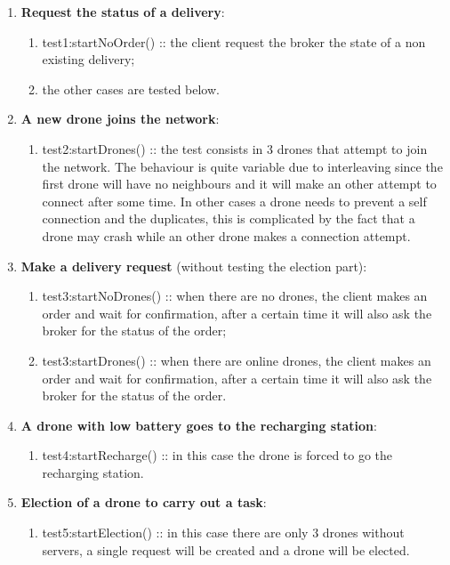 \documentclass[a4paper, oneside]{memoir}
\begin{document}
\begin{enumerate}
\item \textbf{Request the status of a delivery}:
	\begin{enumerate}
	\item \textsf{test1:startNoOrder()} :: the client request the broker the state of a non existing delivery;
	\item the other cases are tested below.
	\end{enumerate}

\item \textbf{A new drone joins the network}:
	\begin{enumerate}
	\item \textsf{test2:startDrones()} :: the test consists in 3 drones that attempt to join the network. The behaviour is quite variable due to interleaving since the first drone will have no neighbours and it will make an other attempt to connect after some time. In other cases a drone needs to prevent a self connection and the duplicates, this is complicated by the fact that a drone may crash while an other drone makes a connection attempt.
	\end{enumerate}

\item \textbf{Make a delivery request} (without testing the election part):
	\begin{enumerate}
	\item \textsf{test3:startNoDrones()} :: when there are no drones, the client makes an order and wait for confirmation, after a certain time it will also ask the broker for the status of the order;
	\item \textsf{test3:startDrones()} :: when there are online drones, the client makes an order and wait for confirmation, after a certain time it will also ask the broker for the status of the order.
	\end{enumerate}

\item \textbf{A drone with low battery goes to the recharging station}:
	\begin{enumerate}
	\item \textsf{test4:startRecharge()} :: in this case the drone is forced to go the recharging station.
	\end{enumerate}

\item \textbf{Election of a drone to carry out a task}:
	\begin{enumerate}
	\item \textsf{test5:startElection()} :: in this case there are only 3 drones without servers, a single request will be created and a drone will be elected.
	\end{enumerate}


\end{enumerate}
\end{document}
